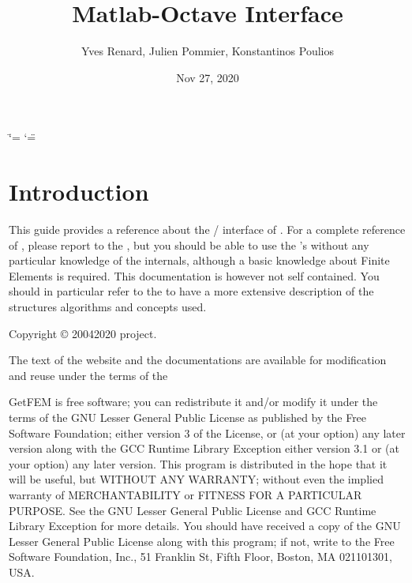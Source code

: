 \documentclass[a4paper,11pt,english]{sphinxmanual}
\title{Matlab-Octave Interface}
\date{Nov 27, 2020}
\author{Yves Renard, Julien Pommier, Konstantinos Poulios}
\begin{document}
\ifdefined\shorthandoff
  \ifnum\catcode`\=\string=\active\shorthandoff{=}\fi
  \ifnum\catcode`\"=\active{}\fi
\fi

\pagestyle{empty}
\sphinxmaketitle
\pagestyle{plain}
\sphinxtableofcontents
\pagestyle{normal}
\label{\detokenize{matlab_octave/index::doc}}



\chapter{Introduction}
\label{\detokenize{matlab_octave/intro:introduction}}\label{\detokenize{matlab_octave/intro:mlab-intro}}\label{\detokenize{matlab_octave/intro::doc}}
This guide provides a reference about the / interface of .
For a complete  reference of , please report to the ,
but you should be able to use the ’s without any particular knowledge
of the  internals, although a basic knowledge about Finite Elements
is required. This documentation is however not self contained. You should in
particular refer to the  to have a more extensive
description of the structures algorithms and concepts used.

Copyright © 2004\sphinxhyphen{}2020  project.

The text of the  website and the documentations are available for modification and reuse under the terms of the 

GetFEM  is  free software;  you  can  redistribute  it  and/or modify it
under  the  terms  of the  GNU  Lesser General Public License as published
by  the  Free Software Foundation;  either version 3 of the License,  or
(at your option) any later version along with the GCC Runtime Library
Exception either version 3.1 or (at your option) any later version.
This program  is  distributed  in  the  hope  that it will be useful,  but
WITHOUT ANY WARRANTY; without even the implied warranty of MERCHANTABILITY
or  FITNESS  FOR  A PARTICULAR PURPOSE.  See the GNU Lesser General Public
License and GCC Runtime Library Exception for more details.
You  should  have received a copy of the GNU Lesser General Public License
along  with  this program;  if not, write to the Free Software Foundation,
Inc., 51 Franklin St, Fifth Floor, Boston, MA  02110\sphinxhyphen{}1301, USA.
\end{document}
